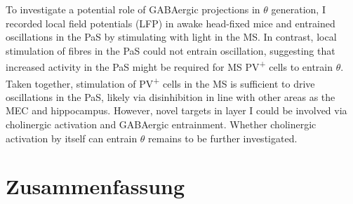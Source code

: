 \documentclass[
  12pt,
  a4paper,
  openany]{book}
\begin{document}
To investigate a potential role of GABAergic projections in \(\theta\) generation, I recorded local field potentials (LFP) in awake head-fixed mice and entrained oscillations in the PaS by stimulating with light in the MS.
In contrast, local stimulation of fibres in the PaS could not entrain oscillation, suggesting that increased activity in the PaS might be required for MS PV\textsuperscript{+} cells to entrain \(\theta\).
Taken together, stimulation of PV\textsuperscript{+} cells in the MS is sufficient to drive oscillations in the PaS, likely via disinhibition in line with other areas as the MEC and hippocampus. However, novel targets in layer I could be involved via cholinergic activation and GABAergic entrainment. Whether cholinergic activation by itself can entrain \(\theta\) remains to be further investigated.

\hypertarget{zusammenfassung}{%
\chapter*{Zusammenfassung}\label{zusammenfassung}}
\end{document}
